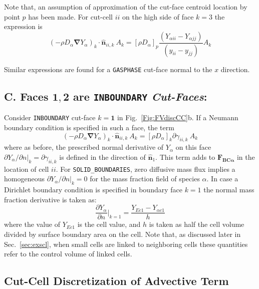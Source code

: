%
Note that, an assumption of approximation of the cut-face centroid location by point $p$ has been made. For cut-cell $ii$ on the high side of face $k=3$ the expression is
%
\begin{equation}
  \left( - \rho D_\alpha \boldsymbol{\nabla} Y_\alpha \right)_k \cdot \hat{\mathbf{n}}_{ii,k} \: A_k =
  [ \rho D_\alpha ]_p \frac{\left(  Y_{\alpha ii} - Y_{\alpha jj} \right)}{(y_{ii}-y_{jj})}A_k
\end{equation}
%

Similar expressions are found for a \texttt{GASPHASE} cut-face normal to the $x$ direction. 


\subsection*{C. Faces $\mathbf{1},\mathbf{2}$ are \texttt{INBOUNDARY} \textit{Cut-Faces}:}

Consider \texttt{INBOUNDARY} cut-face $k=\mathbf{1}$ in Fig.~\ref{Fig:FVdiscCC}b. If a Neumann boundary condition is specified in such a face, the term
%
\begin{equation}
  \left( - \rho D_\alpha \boldsymbol{\nabla} Y_\alpha \right)_k \cdot \hat{\mathbf{n}}_{ii,k} \: A_k = [\rho D_\alpha]_k \partial \gamma_{ii,k} \: A_k
\end{equation}
%
where as before, the prescribed normal derivative of $Y_\alpha$ on this face $\partial Y_\alpha / \partial n |_k=\partial  \gamma_{ii,k}$ is defined in the direction of $\hat{\mathbf{n}}_1$.
This term adds to $\mathbf{F_{BC \alpha}}$ in the location of cell $ii$. For \texttt{SOLID\_BOUNDARIES}, zero diffusive mass flux implies a homogeneous $\partial Y_\alpha / \partial n |_k=0$ for the mass fraction field of species $\alpha$.
In case a Dirichlet boundary condition is specified in boundary face $k=1$ the normal mass fraction derivative is taken as:
%
\begin{equation}
   \frac{\partial Y_\alpha}{\partial n} |_{k=1}=\frac{Y_{Ec1} - Y_{\alpha c1}}{h} 
\end{equation}
%
where the value of $Y_{Ec1}$ is the cell value, and $h$ is taken as half the cell volume divided by surface boundary area on the cell. Note that, as discussed later in Sec.~\ref{sec:exscl}, when small cells are linked to neighboring cells these quantities refer to the control volume of linked cells.


\subsection{Cut-Cell Discretization of Advective Term}

